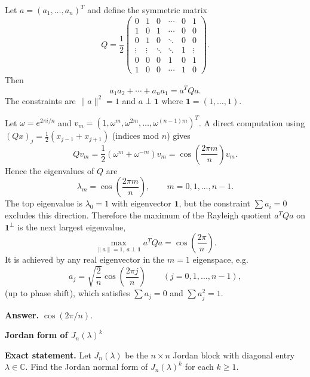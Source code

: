 \begin{solution}
Let $a=(a_1,\dots,a_n)^T$ and define the symmetric matrix
\[
Q=\frac12\begin{pmatrix}
	0&1&0&\cdots&0&1\\
	1&0&1&\cdots&0&0\\
	0&1&0&\ddots&0&0\\
	\vdots&\vdots&\ddots&\ddots&1&\vdots\\
	0&0&0&1&0&1\\
	1&0&0&\cdots&1&0
\end{pmatrix}.
\]
Then
\[
a_1a_2+\cdots+a_na_1=a^TQa.
\]
The constraints are $\|a\|^2=1$ and $a\perp \mathbf 1$ where $\mathbf 1=(1,\dots,1)$.

Let $\omega=e^{2\pi i/n}$ and $v_m=(1,\omega^m,\omega^{2m},\dots,\omega^{(n-1)m})^T$.
A direct computation using $(Qx)_j=\tfrac12(x_{j-1}+x_{j+1})$ (indices mod $n$) gives
\[
Qv_m=\frac12(\omega^m+\omega^{-m})v_m=\cos\!\left(\frac{2\pi m}{n}\right)v_m.
\]
Hence the eigenvalues of $Q$ are
\[
\lambda_m=\cos\!\left(\frac{2\pi m}{n}\right),\qquad m=0,1,\dots,n-1.
\]
The top eigenvalue is $\lambda_0=1$ with eigenvector $\mathbf 1$, but the constraint $\sum a_i=0$ excludes this direction.
Therefore the maximum of the Rayleigh quotient $a^TQa$ on $\mathbf 1^\perp$ is the next largest eigenvalue,
\[
\max_{\|a\|=1,\ a\perp \mathbf 1} a^TQa=\cos\!\left(\frac{2\pi}{n}\right).
\]
It is achieved by any real eigenvector in the $m=1$ eigenspace, e.g.
\[
a_j=\sqrt{\frac{2}{n}}\cos\!\left(\frac{2\pi j}{n}\right)\qquad (j=0,1,\dots,n-1),
\]
(up to phase shift), which satisfies $\sum a_j=0$ and $\sum a_j^2=1$.

\medskip
\noindent
\textbf{Answer.} $\boxed{\cos(2\pi/n)}$.
\end{solution}

\begin{problem}[CP-I-0043]
\label{prob:cp-i-0043}
\textbf{Jordan form of $J_n(\lambda)^k$}

\textbf{Exact statement.}
\hspace*{1.5em}Let $J_n(\lambda)$ be the $n\times n$ Jordan block with diagonal entry $\lambda\in\mathbb C$.
Find the Jordan normal form of $J_n(\lambda)^k$ for each $k\ge 1$.

\end{problem}

